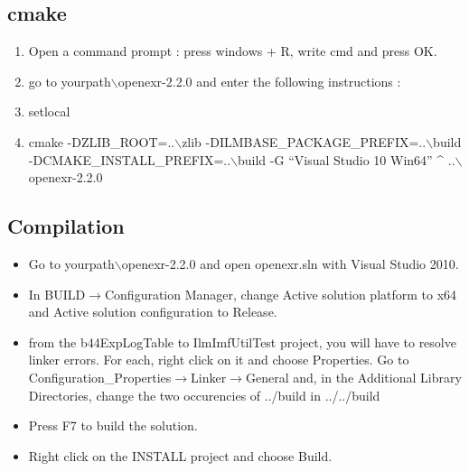 \documentclass{beamer}
\begin{document}
\subsection{cmake}
\begin{frame}
  \begin{enumerate}
    \item Open a command prompt : press windows + R, write cmd and press OK.
    \item go to yourpath$\backslash$openexr-2.2.0 and enter the following instructions :
    \item setlocal
    \item cmake -DZLIB\_ROOT=..$\backslash$zlib -DILMBASE\_PACKAGE\_PREFIX=..$\backslash$build -DCMAKE\_INSTALL\_PREFIX=..$\backslash$build -G ``Visual Studio 10 Win64'' \^{} ..$\backslash$openexr-2.2.0
  \end{enumerate}
\end{frame}

\subsection{Compilation}
\begin{frame}
  \begin{itemize}
    \item Go to yourpath$\backslash$openexr-2.2.0 and open openexr.sln with Visual Studio 2010.
    \item In BUILD$\rightarrow$Configuration Manager, change Active solution platform to x64 and Active solution configuration to Release.
    \item from the b44ExpLogTable to IlmImfUtilTest project, you will have to resolve linker errors. For each, right click on it and choose Properties. Go to Configuration\_Properties$\rightarrow$Linker$\rightarrow$General and, in the Additional Library Directories, change the two occurencies of ../build in ../../build
    \item Press F7 to build the solution.
    \item Right click on the INSTALL project and choose Build.
  \end{itemize}
\end{frame}
\end{document}
